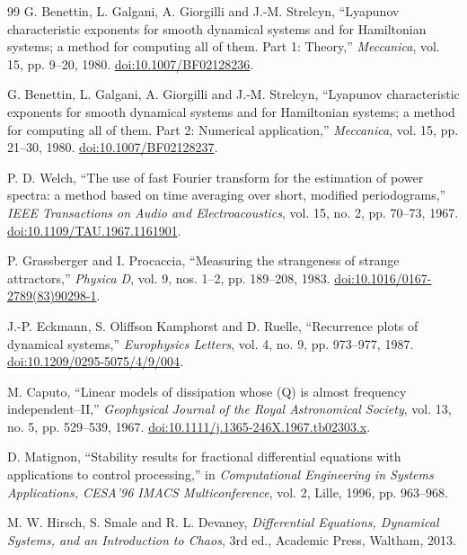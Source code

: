 \documentclass[11pt,a4paper]{article}
\begin{document}
\begin{thebibliography}{99}
G. Benettin, L. Galgani, A. Giorgilli and J.-M. Strelcyn, ``Lyapunov characteristic
exponents for smooth dynamical systems and for Hamiltonian systems; a method for
computing all of them. Part 1: Theory,'' \emph{Meccanica}, vol. 15, pp. 9--20, 1980.
\href{https://doi.org/10.1007/BF02128236}{doi:10.1007/BF02128236}.

G. Benettin, L. Galgani, A. Giorgilli and J.-M. Strelcyn, ``Lyapunov characteristic
exponents for smooth dynamical systems and for Hamiltonian systems; a method for
computing all of them. Part 2: Numerical application,'' \emph{Meccanica}, vol. 15,
pp. 21--30, 1980.
\href{https://doi.org/10.1007/BF02128237}{doi:10.1007/BF02128237}.

P. D. Welch, ``The use of fast Fourier transform for the estimation of power spectra:
a method based on time averaging over short, modified periodograms,''
\emph{IEEE Transactions on Audio and Electroacoustics}, vol. 15, no. 2,
pp. 70--73, 1967.
\href{https://doi.org/10.1109/TAU.1967.1161901}{doi:10.1109/TAU.1967.1161901}.

P. Grassberger and I. Procaccia, ``Measuring the strangeness of strange attractors,''
\emph{Physica D}, vol. 9, nos. 1--2, pp. 189--208, 1983.
\href{https://doi.org/10.1016/0167-2789(83)90298-1}{doi:10.1016/0167-2789(83)90298-1}.

J.-P. Eckmann, S. Oliffson Kamphorst and D. Ruelle, ``Recurrence plots of dynamical
systems,'' \emph{Europhysics Letters}, vol. 4, no. 9, pp. 973--977, 1987.
\href{https://doi.org/10.1209/0295-5075/4/9/004}{doi:10.1209/0295-5075/4/9/004}.

M. Caputo, ``Linear models of dissipation whose (Q) is almost frequency
independent--II,'' \emph{Geophysical Journal of the Royal Astronomical Society},
vol. 13, no. 5, pp. 529--539, 1967.
\href{https://doi.org/10.1111/j.1365-246X.1967.tb02303.x}{doi:10.1111/j.1365-246X.1967.tb02303.x}.

D. Matignon, ``Stability results for fractional differential equations with
applications to control processing,'' in \emph{Computational Engineering in Systems
Applications, CESA'96 IMACS Multiconference}, vol. 2, Lille, 1996, pp. 963--968.

M. W. Hirsch, S. Smale and R. L. Devaney, \emph{Differential Equations,
Dynamical Systems, and an Introduction to Chaos}, 3rd ed., Academic Press,
Waltham, 2013.


\end{thebibliography}
\end{document}
